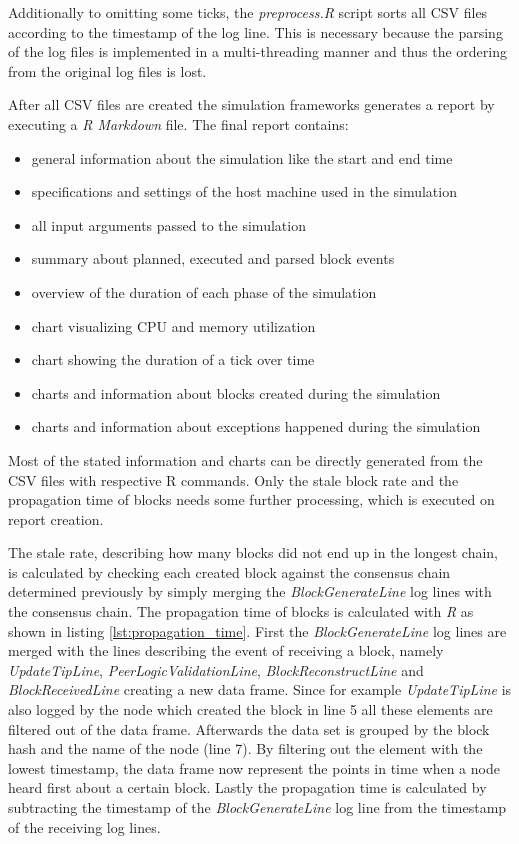Additionally to omitting some ticks, the \textit{preprocess.R} script sorts all CSV files according to the timestamp of the log line.
This is necessary because the parsing of the log files is implemented in a multi-threading manner and thus the ordering from the original log files is lost.

After all CSV files are created the simulation frameworks generates a report by executing a \textit{R Markdown} file.
The final report contains:
\begin{itemize}
	\item general information about the simulation like the start and end time
	\item specifications and settings of the host machine used in the simulation
	\item all input arguments passed to the simulation
	\item summary about planned, executed and parsed block events
	\item overview of the duration of each phase of the simulation
	\item chart visualizing CPU and memory utilization
	\item chart showing the duration of a tick over time
	\item charts and information about blocks created during the simulation
	\item charts and information about exceptions happened during the simulation
\end{itemize}

Most of the stated information and charts can be directly generated from the CSV files with respective R commands.
Only the stale block rate and the propagation time of blocks needs some further processing, which is executed on report creation.

The stale rate, describing how many blocks did not end up in the longest chain, is calculated by checking each created block against the consensus chain determined previously by simply merging the \textit{BlockGenerateLine} log lines with the consensus chain.
The propagation time of blocks is calculated with \textit{R} as shown in listing \ref{lst:propagation_time}.
First the \textit{BlockGenerateLine} log lines are merged with the lines describing the event of receiving a block, namely	\textit{UpdateTipLine}, \textit{PeerLogicValidationLine}, \textit{BlockReconstructLine} and \textit{BlockReceivedLine} creating a new data frame.
Since for example \textit{UpdateTipLine} is also logged by the node which created the block in line 5 all these elements are filtered out of the data frame.
Afterwards the data set is grouped by the block hash and the name of the node (line 7).
By filtering out the element with the lowest timestamp, the data frame now represent the points in time when a node heard first about a certain block.
Lastly the propagation time is calculated by subtracting the timestamp of the \textit{BlockGenerateLine} log line from the timestamp of the receiving log lines.

